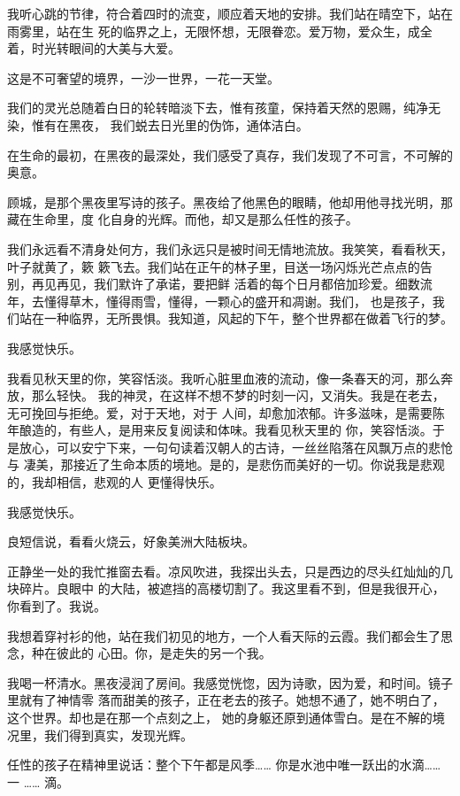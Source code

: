 		我听心跳的节律，符合着四时的流变，顺应着天地的安排。我们站在晴空下，站在雨雾里，站在生
	死的临界之上，无限怀想，无限眷恋。爱万物，爱众生，成全着，时光转眼间的大美与大爱。

		这是不可奢望的境界，一沙一世界，一花一天堂。

		我们的灵光总随着白日的轮转暗淡下去，惟有孩童，保持着天然的恩赐，纯净无染，惟有在黑夜，
	我们蜕去日光里的伪饰，通体洁白。

		在生命的最初，在黑夜的最深处，我们感受了真存，我们发现了不可言，不可解的奥意。

		顾城，是那个黑夜里写诗的孩子。黑夜给了他黑色的眼睛，他却用他寻找光明，那藏在生命里，度
	化自身的光辉。而他，却又是那么任性的孩子。

		我们永远看不清身处何方，我们永远只是被时间无情地流放。我笑笑，看看秋天，叶子就黄了，簌
	簌飞去。我们站在正午的林子里，目送一场闪烁光芒点点的告别，再见再见，我们默许了承诺，要把鲜
	活着的每个日月都倍加珍爱。细数流年，去懂得草木，懂得雨雪，懂得，一颗心的盛开和凋谢。我们，
	也是孩子，我们站在一种临界，无所畏惧。我知道，风起的下午，整个世界都在做着飞行的梦。

		我感觉快乐。

		我看见秋天里的你，笑容恬淡。我听心脏里血液的流动，像一条春天的河，那么奔放，那么轻快。
	我的神灵，在这样不想不梦的时刻一闪，又消失。我是在老去，无可挽回与拒绝。爱，对于天地，对于
	人间，却愈加浓郁。许多滋味，是需要陈年酿造的，有些人，是用来反复阅读和体味。我看见秋天里的
	你，笑容恬淡。于是放心，可以安宁下来，一句句读着汉朝人的古诗，一丝丝陷落在风飘万点的悲怆与
	凄美，那接近了生命本质的境地。是的，是悲伤而美好的一切。你说我是悲观的，我却相信，悲观的人
	更懂得快乐。

		我感觉快乐。

		良短信说，看看火烧云，好象美洲大陆板块。

		正静坐一处的我忙推窗去看。凉风吹进，我探出头去，只是西边的尽头红灿灿的几块碎片。良眼中
	的大陆，被遮挡的高楼切割了。我这里看不到，但是我很开心，你看到了。我说。

		我想着穿衬衫的他，站在我们初见的地方，一个人看天际的云霞。我们都会生了思念，种在彼此的
	心田。你，是走失的另一个我。

		我喝一杯清水。黑夜浸润了房间。我感觉恍惚，因为诗歌，因为爱，和时间。镜子里就有了神情零
	落而甜美的孩子，正在老去的孩子。她想不通了，她不明白了，这个世界。却也是在那一个点刻之上，
	她的身躯还原到通体雪白。是在不解的境况里，我们得到真实，发现光辉。

		任性的孩子在精神里说话：整个下午都是风季…… 你是水池中唯一跃出的水滴…… 一 …… 滴。

